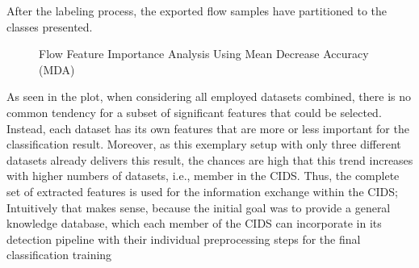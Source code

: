 \documentclass[../../main.tex]{subfiles}
\begin{document}
 \begin{table}[t]
    \footnotesize
    \centering
    \setlength{\extrarowheight}{0pt}
    \addtolength{\extrarowheight}{\aboverulesep}
    \addtolength{\extrarowheight}{\belowrulesep}
    \setlength{\aboverulesep}{0pt}
    \setlength{\belowrulesep}{0pt}
    \setlength{\extrarowheight}{.1em}
     
    \caption[Preprocessed Flows]{After the labeling process, the exported flow samples have partitioned to the classes presented.}
    \label{tab:preprocessed_flows}
\end{table}

\begin{figure}[t]
    \centering
    
    \caption[Flow Feature Importance Analysis]{Flow Feature Importance Analysis Using Mean Decrease Accuracy (MDA)}
    \label{fig:feature_importances}
\end{figure}

 As seen in the plot, when considering all employed datasets combined, there is no common tendency for a subset of significant features that could be selected. Instead, each dataset has its own features that are more or less important for the classification result. Moreover, as this exemplary setup with only three different datasets already delivers this result, the chances are high that this trend increases with higher numbers of datasets, i.e., member in the CIDS. Thus, the complete set of extracted features is used for the information exchange within the CIDS; Intuitively that makes sense, because the initial goal was to provide a general knowledge database, which each member of the CIDS can incorporate in its detection pipeline with their individual preprocessing steps for the final classification training
\end{document}
